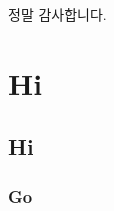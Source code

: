 \begin{koreansummary}
	정말 감사합니다.
	\section{Hi}
	\subsection{Hi}
	\subsubsection{Go}
\end{koreansummary}